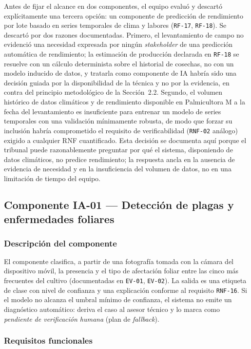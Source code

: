 \documentclass[11pt,a4paper]{article}
\newcommand{\id}[1]{\texttt{#1}}
\begin{document}
Antes de fijar el alcance en dos componentes, el equipo evaluó y descartó explícitamente una
tercera opción: un componente de predicción de rendimiento por lote basado en series temporales de
clima y labores (\id{RF-17}, \id{RF-18}). Se descartó por dos razones documentadas. Primero, el
levantamiento de campo no evidenció una necesidad expresada por ningún \emph{stakeholder} de una
predicción automática de rendimiento; la estimación de producción declarada en \id{RF-18} se
resuelve con un cálculo determinista sobre el historial de cosechas, no con un modelo inducido de
datos, y tratarla como componente de IA habría sido una decisión guiada por la disponibilidad de la
técnica y no por la evidencia, en contra del principio metodológico de la Sección~2.2. Segundo, el
volumen histórico de datos climáticos y de rendimiento disponible en Palmicultora M a la fecha del
levantamiento es insuficiente para entrenar un modelo de series temporales con una validación
mínimamente robusta, de modo que forzar su inclusión habría comprometido el requisito de
verificabilidad (\id{RNF-02} análogo) exigido a cualquier RNF cuantificado. Esta decisión se
documenta aquí porque el tribunal puede razonablemente preguntar por qué el sistema, disponiendo de
datos climáticos, no predice rendimiento; la respuesta ancla en la ausencia de evidencia de
necesidad y en la insuficiencia del volumen de datos, no en una limitación de tiempo del equipo.

\subsection{Componente IA-01 --- Detección de plagas y enfermedades foliares}

\subsubsection{Descripción del componente}

El componente clasifica, a partir de una fotografía tomada con la cámara del dispositivo móvil, la
presencia y el tipo de afectación foliar entre las cinco más frecuentes del cultivo (documentadas
en \id{EV-01}, \id{EV-02}). La salida es una etiqueta de clase con nivel de confianza y una
explicación conforme al requisito \id{RNF-16}. Si el modelo no alcanza el umbral mínimo de
confianza, el sistema no emite un diagnóstico automático: deriva el caso al asesor técnico y lo
marca como \emph{pendiente de verificación humana} (plan de \emph{fallback}).

\subsubsection{Requisitos funcionales}
\end{document}
